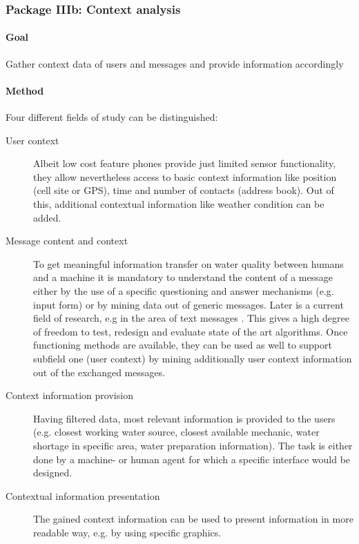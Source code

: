 \documentclass[11pt]{article}
\begin{document}






\subsubsection*{Package IIIb: Context analysis}
\paragraph{Goal} Gather context data of users and messages and provide information accordingly

\paragraph{Method}
Four different fields of study can be distinguished:
\begin{description}
 \item [User context] Albeit low cost feature phones provide just limited sensor functionality, they allow nevertheless access to basic context information like position (cell site or GPS), time and number of contacts (address book). Out of this, additional contextual information like weather condition can be added.
 \item [Message content and context] To get meaningful information transfer on water quality between humans and a machine it is mandatory to understand the content of a message either by the use of a specific questioning and answer mechanisms (e.g. input form) or by mining data out of generic messages. Later is a current field of research, e.g in the area of text messages \citep{aggarwal2012mining}. This gives a high degree of freedom to test, redesign and evaluate state of the art algorithms. Once functioning methods are available, they can be used as well to support subfield one (user context) by mining additionally user context information out of the exchanged messages. 
 \item [Context information provision] Having filtered data, most relevant information is provided to the users (e.g. closest working water source, closest available mechanic, water shortage in specific area, water preparation information). The task is either done by a machine- or human agent for which a specific interface would be designed.
 \item [Contextual information presentation] The gained context information can be used to present information in more readable way, e.g. by using specific graphics.
\end{description}
\end{document}
